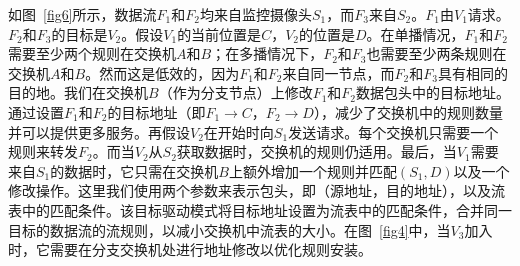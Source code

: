 \documentclass{ctexart}
\begin{document}

如图~\ref{fig6}所示，数据流$F_{1}$和$F_{2}$均来自监控摄像头$S_{1}$，而$F_{3}$来自$S_{2}$。$F_{1}$由$V_{1}$请求。$F_{2}$和$F_{3}$的目标是$V_{2}$。假设$V_{1}$的当前位置是$C$，$V_{2}$的位置是$D$。在单播情况，$F_{1}$和$F_{2}$需要至少两个规则在交换机$A$和$B$；在多播情况下，$F_{2}$和$F_{3}$也需要至少两条规则在交换机$A$和$B$。然而这是低效的，因为$F_{1}$和$F_{2}$来自同一节点，而$F_{2}$和$F_{3}$具有相同的目的地。我们在交换机$B$（作为分支节点）上修改$F_{1}$和$F_{2}$数据包头中的目标地址。通过设置$F_{1}$和$F_{2}$的目标地址（即$F_{1} \to C$，$F_{2} \to D$），减少了交换机中的规则数量并可以提供更多服务。再假设$V_{2}$在开始时向$S_{1}$发送请求。每个交换机只需要一个规则来转发$F_{2}$。而当$V_{2}$从$S_{2}$获取数据时，交换机的规则仍适用。最后，当$V_{1}$需要来自$S_{1}$的数据时，它只需在交换机$B$上额外增加一个规则并匹配$(S_ {1},D)$以及一个修改操作。这里我们使用两个参数来表示包头，即（源地址，目的地址），以及流表中的匹配条件。该目标驱动模式将目标地址设置为流表中的匹配条件，合并同一目标的数据流的流规则，以减小交换机中流表的大小。在图~\ref{fig4}中，当$V_ {3}$加入时，它需要在分支交换机处进行地址修改以优化规则安装。
\end{document}
